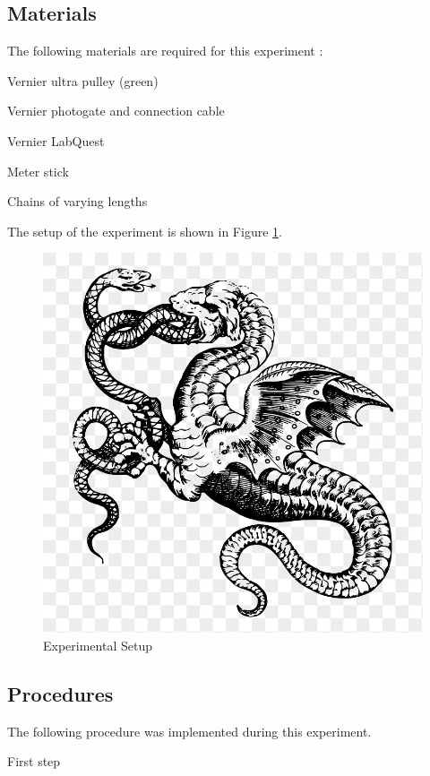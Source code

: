 \documentclass[stu,biblatex,floatsintext,draftall]{apa7}
\begin{document}
\subsection{Materials}
The following materials are required for this experiment \parencite{Hilsdorf2023AtwoodsHeavyChainHandout}:
\begin{APAitemize}
	\item Vernier ultra pulley (green)
	\item Vernier photogate and connection cable
	\item Vernier LabQuest
	\item Meter stick
	\item Chains of varying lengths %
\end{APAitemize}
The setup of the experiment is shown in Figure \ref{fig:setup}.
\begin{figure}
	\centering
	\caption{Experimental Setup}
	\label{fig:setup}
	\includegraphics{dragon}
\end{figure}

\subsection{Procedures}
The following procedure was implemented during this experiment.
\begin{APAenumerate}
	\item First step
\end{APAenumerate}
\end{document}
